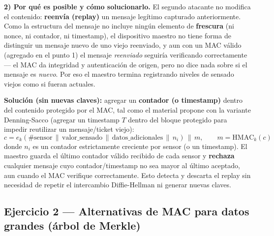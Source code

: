 \textbf{2) Por qué es posible y cómo solucionarlo.}
El segundo atacante no modifica el contenido: \textbf{reenvía (replay)} un mensaje
legítimo capturado anteriormente. Como la estructura del mensaje no incluye ningún
elemento de \textbf{frescura} (ni nonce, ni contador, ni timestamp), el dispositivo
maestro no tiene forma de distinguir un mensaje nuevo de uno viejo reenviado, y aun con
un MAC válido (agregado en el punto 1) el mensaje \emph{reenviado} seguiría verificando
correctamente --- el MAC da integridad y autenticación de origen, pero no dice nada
sobre si el mensaje es \emph{nuevo}. Por eso el maestro termina registrando niveles de
sensado viejos como si fueran actuales.

\textbf{Solución (sin nuevas claves):} agregar un \textbf{contador (o timestamp)} dentro
del contenido protegido por el MAC, tal como el material propone con la variante
Denning-Sacco (agregar un timestamp $T$ dentro del bloque protegido para impedir
reutilizar un mensaje/ticket viejo):
\begin{equation*}
c = e_k(\#\text{sensor}\,\|\,\text{valor\_sensado}\,\|\,\text{datos\_adicionales}\,\|\,n_i)\,\|\,m,
\qquad m=\mathrm{HMAC}_k(c)
\end{equation*}
donde $n_i$ es un contador estrictamente creciente por sensor (o un timestamp). El
maestro guarda el último contador válido recibido de cada sensor y \textbf{rechaza}
cualquier mensaje cuyo contador/timestamp no sea mayor al último aceptado, aun cuando el
MAC verifique correctamente. Esto detecta y descarta el replay sin necesidad de repetir
el intercambio Diffie-Hellman ni generar nuevas claves.

\subsection{Ejercicio 2 --- Alternativas de MAC para datos grandes (árbol de Merkle)}

